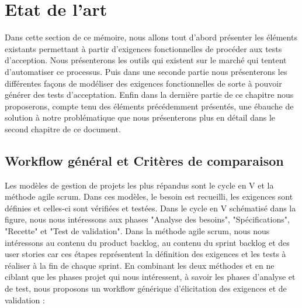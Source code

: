 \chapter{Etat de l'art}
\label{chap:premierchapitre}

Dans cette section de ce mémoire, nous allons tout d'abord présenter les éléments existants permettant à partir d'exigences fonctionnelles de procéder aux tests d'acception. Nous présenterons les outils qui existent sur le marché qui tentent d'automatiser ce processus. Puis dans une seconde partie nous présenterons les différentes façons de modéliser des exigences fonctionnelles de sorte à pouvoir générer des tests d'acceptation. Enfin dans la dernière partie de ce chapitre nous proposerons, compte tenu des éléments précédemment présentés, une ébauche de solution à notre problématique que nous présenterons plus en détail dans le second chapitre de ce document.

\section{Workflow général et Critères de comparaison}

Les modèles de gestion de projets les plus répandus sont le cycle en V et la méthode agile scrum. Dans ces modèles, le besoin est recueilli, les exigences sont définies et celles-ci sont vérifiées et testées. Dans le cycle en V schématisé dans la figure, nous nous intéressons aux phases "Analyse des besoins", "Spécifications", "Recette" et "Test de validation". Dans la méthode agile scrum, nous nous intéressons au contenu du product backlog, au contenu du sprint backlog et des user stories car ces étapes représentent la définition des exigences et les tests à réaliser à la fin de chaque sprint. En combinant les deux méthodes et en ne ciblant que les phases projet qui nous intéressent, à savoir les phases d'analyse et de test, nous proposons un workflow générique d'élicitation des exigences et de validation : 

